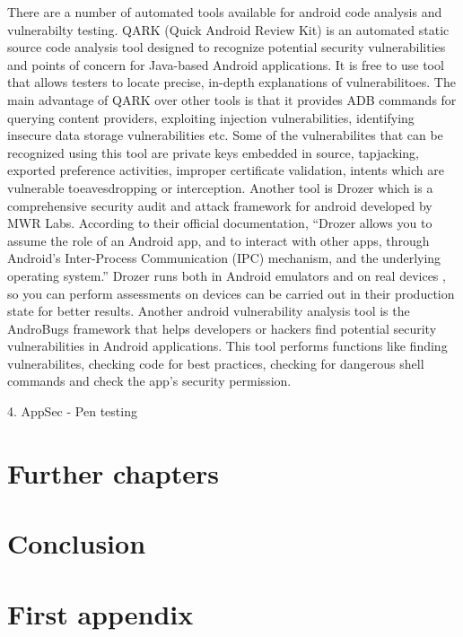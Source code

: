 \documentclass{mproj}
\begin{document}
There are a number of automated tools available for android code analysis and vulnerabilty testing. QARK (Quick Android Review Kit) is an automated static source code analysis tool designed to recognize potential security vulnerabilities and points of concern for Java-based Android applications. It is free to use tool that allows testers to locate precise, in-depth explanations of vulnerabilitoes.  The main advantage of QARK over other tools is that it provides  ADB commands for querying content providers, exploiting injection vulnerabilities, identifying insecure data storage vulnerabilities etc. Some of the vulnerabilites that can be recognized using this tool are private keys embedded in source, tapjacking, exported preference activities, improper certificate validation, intents which are vulnerable toeavesdropping or interception. Another tool is Drozer which is a comprehensive security audit and attack framework for android developed by MWR Labs. According to their official documentation, “Drozer allows you to assume the role of an Android app, and to interact with other apps, through Android’s Inter-Process Communication (IPC) mechanism, and the underlying operating system.” Drozer runs both in Android emulators and on real devices , so you can perform assessments on devices can be carried out in their production state for better results. Another android vulnerability analysis tool is the AndroBugs framework that helps developers or hackers find potential security vulnerabilities in Android applications. This tool performs functions like finding vulnerabilites, checking code for best practices, checking for dangerous shell commands and check the app's security permission.


4. AppSec - Pen testing



\chapter{Further chapters}


\chapter{Conclusion}\label{conclusion}

\appendix %
\chapter{First appendix}
\end{document}
